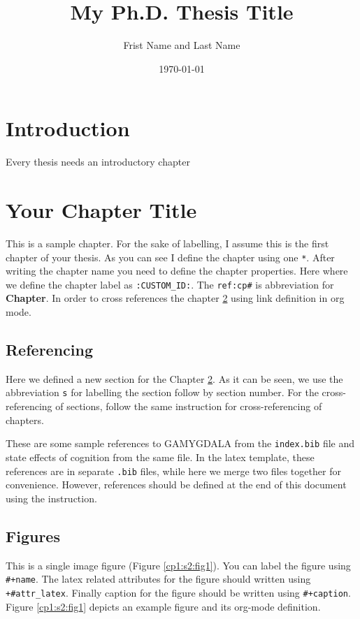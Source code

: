 \documentclass[12pt]{report}
\author{Frist Name and Last Name}
\date{\today}
\title{My Ph.D. Thesis Title}
\numberwithin{equation}{section}
\theoremstyle{definition}
\theoremstyle{remark}
\theoremstyle{example}
\theoremstyle{axiom}
\begin{document}
\beforepreface                                         %
\afterpreface


\chapter{Introduction}
\label{intro}
Every thesis needs an introductory chapter

\setcounter{figure}{0}
\setcounter{equation}{0}
\setcounter{table}{0}

\chapter{Your Chapter Title}
\label{cp1}
This is a sample chapter. For the sake of labelling, I assume this is the first
chapter of your thesis. As you can see I define the chapter using one \texttt{*}. After
writing the chapter name you need to define the chapter properties. Here where
we define the chapter label as \texttt{:CUSTOM\_ID:}. The \texttt{ref:cp\#} is abbreviation for
\textbf{Chapter}. In order to cross references the chapter \ref{cp1} using link definition
in org mode.

\section{Referencing}
\label{cp1:s1}
Here we defined a new section for the Chapter \ref{cp1}. As it can be seen, we use
the abbreviation \texttt{s} for labelling the section follow by section number. For the
cross-referencing of sections, follow the same instruction for
cross-referencing of  chapters.

These are some sample references to GAMYGDALA \cite{popescu2014gamygdala} from
the \texttt{index.bib} file and state effects of cognition
\cite{hudlicka2002time} from the same file. In the latex template, these
references are in separate \texttt{.bib} files, while here we merge two files
together for convenience. However, references should be defined at the end of
this document using the instruction.

\section{Figures}
\label{cp1:s2}
This is a single image figure (Figure \ref{cp1:s2:fig1}). You can label the figure
using \texttt{\#+name}. The latex related attributes for the figure should written using
\texttt{+\#attr\_latex}. Finally caption for the figure should be written using
\texttt{\#+caption}. Figure \ref{cp1:s2:fig1} depicts an example figure and its org-mode
definition.
\end{document}
